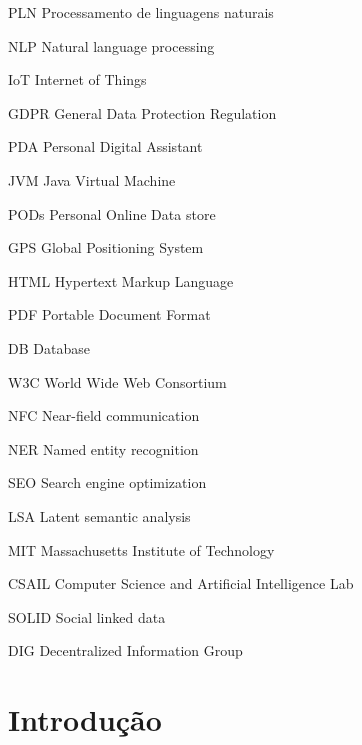 \documentclass[
	12pt,				%
	openright,			%
	twoside,			%
	a4paper,			%
	english,			%
	french,				%
	spanish,			%
	brazil				%
	]{abntex2}
\begin{document}
\begin{siglas}
    \item[PLN] Processamento de linguagens naturais
    \item[NLP] Natural language processing
    \item[IoT] Internet of Things
    \item[GDPR] General Data Protection Regulation
    \item[PDA] Personal Digital Assistant
    \item[JVM] Java Virtual Machine
    \item[PODs] Personal Online Data store
    \item[GPS] Global Positioning System
    \item[HTML] Hypertext Markup Language
    \item[PDF] Portable Document Format
    \item[DB] Database
    \item[W3C] World Wide Web Consortium
    \item[NFC] Near-field communication
    \item[NER] Named entity recognition
    \item[SEO] Search engine optimization
    \item[LSA] Latent semantic analysis
    \item[MIT] Massachusetts Institute of Technology
    \item[CSAIL] Computer Science and Artificial Intelligence Lab
    \item[SOLID] Social linked data
    \item[DIG] Decentralized Information Group
\end{siglas}

\tableofcontents*
\cleardoublepage



\textual

\part{Introdução}
\end{document}
